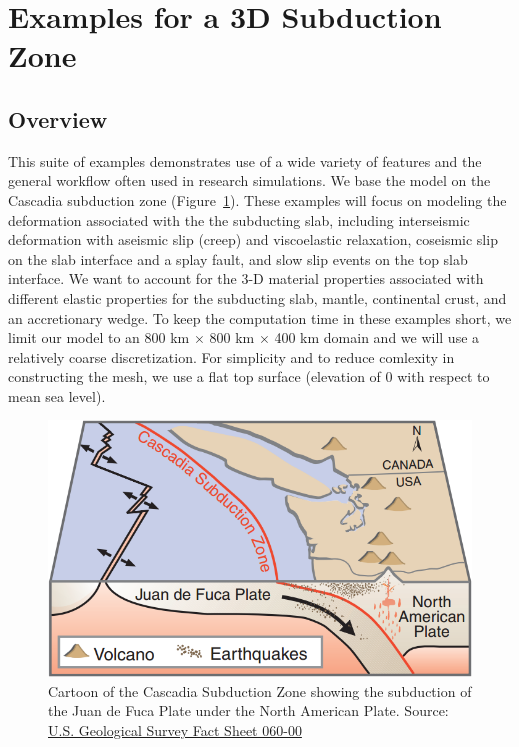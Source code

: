 \section{Examples for a 3D Subduction Zone}
\label{sec:example:subduction:3d}

\subsection{Overview}

This suite of examples demonstrates use of a wide variety of features
and the general workflow often used in research simulations. We base
the model on the Cascadia subduction zone
(Figure~\ref{fig:example:subduction:3d:cascadia}). These examples will
focus on modeling the deformation associated with the the subducting
slab, including interseismic deformation with aseismic slip (creep)
and viscoelastic relaxation, coseismic slip on the slab interface and
a splay fault, and slow slip events on the top slab interface. We want
to account for the 3-D material properties associated with different
elastic properties for the subducting slab, mantle, continental crust,
and an accretionary wedge. To keep the computation time in these
examples short, we limit our model to an 800 km $\times$ 800 km
$\times$ 400 km domain and we will use a relatively coarse
discretization. For simplicity and to reduce comlexity in constructing
the mesh, we use a flat top surface (elevation of 0 with respect
to mean sea level).

\begin{figure}[htbp]
  \includegraphics[width=4.5in]{examples/figs/subduction3d_cascadia}
  \caption{Cartoon of the Cascadia Subduction Zone showing the
    subduction of the Juan de Fuca Plate under the North American
    Plate. Source:
    \href{https://pubs.usgs.gov/fs/2000/fs060-00/}{U.S. Geological
      Survey Fact Sheet 060-00}}
  \label{fig:example:subduction:3d:cascadia}
\end{figure}

